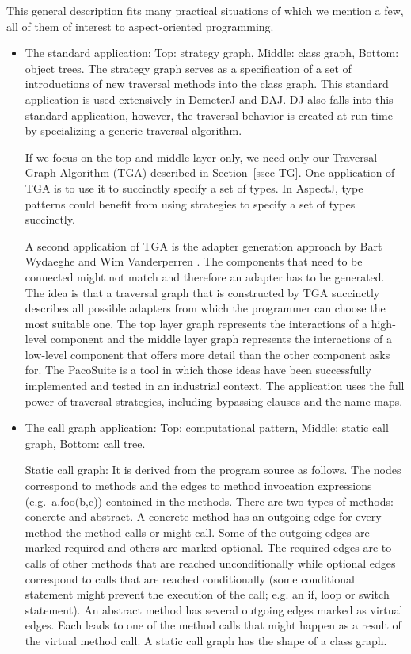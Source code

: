 This general description fits many practical situations of which we
mention a few, all of them of interest to aspect-oriented programming.

\begin{itemize}
\item 
The standard application: Top: strategy graph, Middle: class graph,
Bottom: object trees. The strategy graph serves as a specification of
a set of introductions of new traversal methods into the class graph.
This standard application is used extensively in DemeterJ and DAJ.  DJ
also falls into this standard application, however, the traversal
behavior is created at run-time by specializing a generic traversal
algorithm.

If we focus on the top and middle layer only, we need only our
Traversal Graph Algorithm (TGA) described in Section~\ref{ssec-TG}.
One application of TGA is to use it to succinctly specify a set of
types. In AspectJ, type patterns could benefit from using strategies
to specify a set of types succinctly.

A second application of TGA is the adapter generation approach by Bart
Wydaeghe and Wim Vanderperren
\cite{bart:thesis02,bart-wim:strategies-ref,vanderperren:composition-adapters}.
The components that need to be connected might not match and therefore
an adapter has to be generated. The idea is that a traversal graph
that is constructed by TGA succinctly describes all possible adapters
from which the programmer can choose the most suitable one. The top
layer graph represents the interactions of a high-level component and
the middle layer graph represents the interactions of a low-level
component that offers more detail than the other component asks for.
The PacoSuite is a tool in which those ideas have been successfully
implemented and tested in an industrial context. The application uses
the full power of traversal strategies, including bypassing clauses
and the name maps.

\item The call graph application: Top: computational pattern, Middle:
static call graph, Bottom: call tree.

Static call graph: It is derived from the program source as
follows. The nodes correspond to methods and the edges to method
invocation expressions (e.g.\ {\sf a.foo(b,c)}) contained in the
methods. There are two types of methods: concrete and abstract. A
concrete method has an outgoing edge for every method the method calls
or might call. Some of the outgoing edges are marked required and
others are marked optional. The required edges are to calls of other
methods that are reached unconditionally while optional edges
correspond to calls that are reached conditionally (some conditional
statement might prevent the execution of the call; e.g. an if, loop or
switch statement). An abstract method has several outgoing edges
marked as virtual edges. Each leads to one of the method calls that
might happen as a result of the virtual method call. A static call
graph has the shape of a class graph.


\end{itemize}
